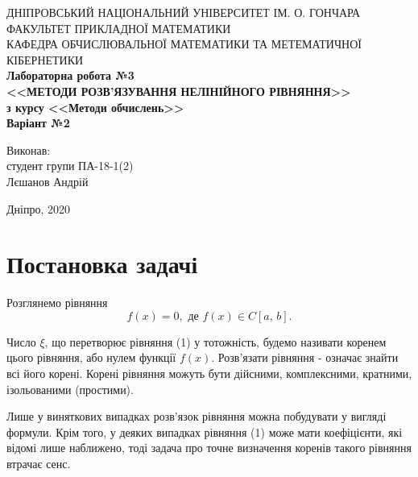 \documentclass[14pt,a4paper,titlepage]{extarticle}
\begin{document}
      \begin{titlepage}
         \begin{center}
ДНІПРОВСЬКИЙ НАЦІОНАЛЬНИЙ УНІВЕРСИТЕТ ІМ. О. ГОНЧАРА\\
ФАКУЛЬТЕТ ПРИКЛАДНОЇ МАТЕМАТИКИ\\
КАФЕДРА ОБЧИСЛЮВАЛЬНОЇ МАТЕМАТИКИ ТА МЕТЕМАТИЧНОЇ
КІБЕРНЕТИКИ\\
            \vspace{6cm}
            \bf Лабораторна робота №3\\
            \bf <<МЕТОДИ РОЗВ’ЯЗУВАННЯ НЕЛІНІЙНОГО РІВНЯННЯ>>\\
            \bf з курсу <<Методи обчислень>>\\
            \bf Варіант №2
        \end{center}
        \vspace{5cm}
        \begin{flushright}
Виконав:\\
студент групи ПА-18-1(2)\\
Лєшанов Андрій
        \end{flushright}
        \begin{center}
        \vspace{5.5cm}
        Дніпро, 2020
        \end{center}
   \end{titlepage}
\setcounter{page}{2}
\newpage
{\centering\tableofcontents}
\newpage
{\centering \section*{Постановка задачі}}

Розглянемо рівняння
\begin{equation}
f(x)=0,\text{ де } f(x)\in C[a,\, b].
\end{equation}

Число $\xi$, що перетворює рівняння (1) у тотожність, будемо називати коренем цього рівняння, або нулем функції $f(x)$. Розв'язати рівняння - означає знайти всі його корені. Корені рівняння можуть бути дійсними, комплексними, кратними, ізольованими (простими).

Лише у виняткових випадках розв'язок рівняння можна побудувати у вигляді формули. Крім того, у деяких випадках рівняння (1) може мати коефіцієнти, які відомі лише наближено, тоді задача про точне визначення коренів такого рівняння втрачає сенс.
\end{document}
